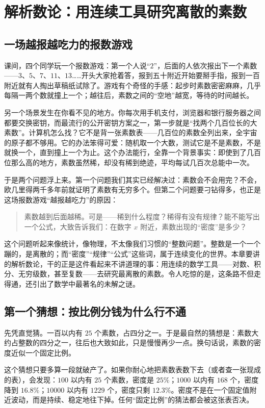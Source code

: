 \chapter{解析数论：用连续工具研究离散的素数}

\section{一场越报越吃力的报数游戏}

课间，四个同学玩一个报数游戏：第一个人说“$2$”，后面的人依次报出下一个素数——$3$、$5$、$7$、$11$、$13$……开头大家抢着答，报到五十附近开始要掰手指，报到一百附近就有人掏出草稿纸试除了。游戏有个奇怪的手感：起步时素数密密麻麻，几乎每隔一两个数就撞上一个；越往后，素数之间的“空地”越宽，等待的时间越长。

另一个场景发生在你看不见的地方。你每次用手机支付，浏览器和银行服务器之间都要交换密钥，而最流行的公开密钥方案之一，第一步就是“找两个几百位长的大素数”。计算机怎么找？它不是背一张素数表——几百位的素数全列出来，全宇宙的原子都不够用。它的办法笨得可爱：随机取一个大数，测试它是不是素数，不是就换一个，直到撞上一个为止。这个办法能行，全靠一个背景事实：即使到了几百位那么高的地方，素数虽然稀，却没有稀到绝迹，平均每试几百次总能中一次。

于是两个问题浮上来。第一个问题我们其实已经解决过：素数会不会用完？不会，欧几里得两千多年前就证明了素数有无穷多个。但第二个问题要刁钻得多，也正是这场报数游戏“越报越吃力”的原因：

\begin{quote}
素数越到后面越稀。可是——稀到什么程度？稀得有没有规律？能不能写出一个公式，大致告诉我们：在数字 $x$ 附近，素数出现的“密度”是多少？
\end{quote}

这个问题听起来像统计，像物理，不太像我们习惯的“整数问题”。整数是一个一个蹦的，是离散的；而“密度”“规律”“公式”这些词，属于连续变化的世界。本章要讲的解析数论，干的正是这件看起来不讲道理的事：用连续的数学工具——对数、积分、无穷级数，甚至复数——去研究最离散的素数。令人吃惊的是，这条路不但走得通，还引出了数学中最著名的未解之谜。

\section{第一个猜想：按比例分钱为什么行不通}

先凭直觉猜。一百以内有 $25$ 个素数，占四分之一。于是最自然的猜想是：素数大约占整数的四分之一，往后也大致如此，只是慢慢再少一点。换句话说，素数的密度近似一个固定比例。

这个猜想只要多算一段就破产了。如果你耐心地把素数表数下去（或者查一张现成的表），会发现：$100$ 以内有 $25$ 个素数，密度是 $25\%$；$1000$ 以内有 $168$ 个，密度降到 $16.8\%$；$10000$ 以内有 $1229$ 个，密度只剩 $12.3\%$。密度不是在一个固定值附近波动，而是持续、稳定地往下掉。任何“固定比例”的猜法都会被这张表否决。

